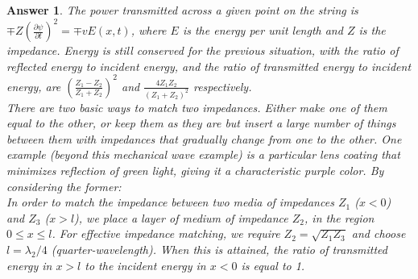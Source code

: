 \documentclass[a4paper]{article}
\newtheorem{ans}{Answer}[subsection]
\theoremstyle{new}
\begin{document}
\begin{ans}
The power transmitted across a given point on the string is $\mp Z(\frac{\partial\psi}{\partial t})^2=\mp vE(x,t)$, where $E$ is the energy per unit length and $Z$ is the impedance. Energy is still conserved for the previous situation, with the ratio of reflected energy to incident energy, and the ratio of transmitted energy to incident energy, are $(\frac{Z_1-Z_2}{Z_1+Z_2})^2$ and $\frac{4Z_1Z_2}{(Z_1+Z_2)^2}$ respectively.\\[5pt]
There are two basic ways to match two impedances. Either make one of them equal to the other, or keep them as they are but insert a large number of things between them with impedances that gradually change from one to the other. One example (beyond this mechanical wave example) is a particular lens coating that minimizes reflection of green light, giving it a characteristic purple color. By considering the former:\\[5pt]
In order to match the impedance between two media of impedances $Z_1$ ($x<0$) and $Z_3$ ($x>l$), we place a layer of medium of impedance $Z_2$, in the region $0\leq x\leq l$. For effective impedance matching, we require $Z_2=\sqrt{Z_1Z_3}$ and choose $l=\lambda_2/4$ (quarter-wavelength). When this is attained, the ratio of transmitted energy in $x>l$ to the incident energy in $x<0$ is equal to 1. 
\newpage

\end{ans}
\end{document}
